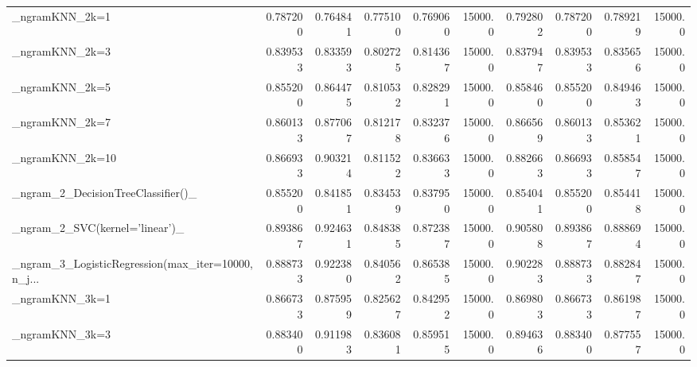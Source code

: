 \begin{tabular}{lrrrrrrrrr}
\_ngramKNN\_2k=1                                     &  0.787200 &         0.764841 &      0.775100 &        0.769060 &        15000.0 &            0.792802 &         0.787200 &           0.789219 &           15000.0 \\
\_ngramKNN\_2k=3                                     &  0.839533 &         0.833593 &      0.802725 &        0.814367 &        15000.0 &            0.837947 &         0.839533 &           0.835656 &           15000.0 \\
\_ngramKNN\_2k=5                                     &  0.855200 &         0.864475 &      0.810532 &        0.828291 &        15000.0 &            0.858460 &         0.855200 &           0.849463 &           15000.0 \\
\_ngramKNN\_2k=7                                     &  0.860133 &         0.877067 &      0.812178 &        0.832376 &        15000.0 &            0.866569 &         0.860133 &           0.853621 &           15000.0 \\
\_ngramKNN\_2k=10                                    &  0.866933 &         0.903214 &      0.811522 &        0.836633 &        15000.0 &            0.882663 &         0.866933 &           0.858547 &           15000.0 \\
\_ngram\_2\_DecisionTreeClassifier()\_                 &  0.855200 &         0.841851 &      0.834539 &        0.837950 &        15000.0 &            0.854041 &         0.855200 &           0.854418 &           15000.0 \\
\_ngram\_2\_SVC(kernel='linear')\_                     &  0.893867 &         0.924631 &      0.848385 &        0.872387 &        15000.0 &            0.905808 &         0.893867 &           0.888694 &           15000.0 \\
\_ngram\_3\_LogisticRegression(max\_iter=10000, n\_j... &  0.888733 &         0.922380 &      0.840562 &        0.865385 &        15000.0 &            0.902283 &         0.888733 &           0.882847 &           15000.0 \\
\_ngramKNN\_3k=1                                     &  0.866733 &         0.875959 &      0.825627 &        0.842952 &        15000.0 &            0.869803 &         0.866733 &           0.861987 &           15000.0 \\
\_ngramKNN\_3k=3                                     &  0.883400 &         0.911983 &      0.836081 &        0.859515 &        15000.0 &            0.894636 &         0.883400 &           0.877557 &           15000.0 \\

\end{tabular}
